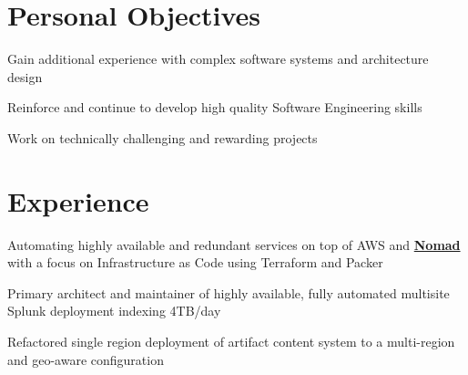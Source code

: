 \documentclass[]{deedy-resume}
\begin{document}
\hfill
\begin{minipage}[t]{0.66\textwidth} %


\section{Personal Objectives}
\vspace{\topsep} %
\begin{tightemize}
\item Gain additional experience with complex software systems and architecture design
\item Reinforce and continue to develop high quality Software Engineering skills
\item Work on technically challenging and rewarding projects
\end{tightemize}
\sectionsep


\section{Experience}



\begin{tightemize}
\item Automating highly available and redundant services on top of AWS and \href{https://www.nomadproject.io}{\bf Nomad} with a focus on Infrastructure as Code using Terraform and Packer
\item Primary architect and maintainer of highly available, fully automated multisite Splunk deployment indexing 4TB/day
\item Refactored single region deployment of artifact content system to a multi-region and geo-aware configuration
\end{tightemize}
\sectionsep



\end{minipage}
\end{document}
